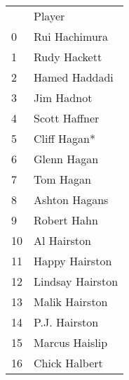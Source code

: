 \begin{tabular}{ll}

{} &            Player \\

0  &     Rui Hachimura \\
1  &      Rudy Hackett \\
2  &     Hamed Haddadi \\
3  &        Jim Hadnot \\
4  &     Scott Haffner \\
5  &      Cliff Hagan* \\
6  &       Glenn Hagan \\
7  &         Tom Hagan \\
8  &     Ashton Hagans \\
9  &       Robert Hahn \\
10 &       Al Hairston \\
11 &    Happy Hairston \\
12 &  Lindsay Hairston \\
13 &    Malik Hairston \\
14 &     P.J. Hairston \\
15 &    Marcus Haislip \\
16 &     Chick Halbert \\

\end{tabular}
